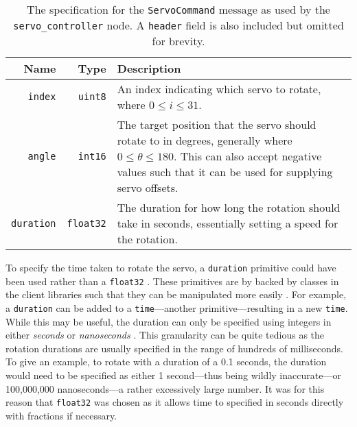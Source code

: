 \begin{table}[!h]
	\centering
	\begin{tabular}{ r r p{10cm} }
		\toprule
		\textbf{Name} & 
		\textbf{Type} & 
		\textbf{Description} \\
		\midrule

		\texttt{index} & 
		\texttt{uint8} &
		An index indicating which servo to rotate, where $0 \leq i \leq 31$. \\
		
		\hline

		\texttt{angle} & 
		\texttt{int16} & 
		The target position that the servo should rotate to in degrees, generally where $0 \leq \theta \leq 180$. This can also accept negative values such that it can be used for supplying servo offsets. \\
		
		\hline

		\texttt{duration} &
		\texttt{float32} &
		The duration for how long the rotation should take in seconds, essentially setting a speed for the rotation. \\
		\bottomrule
	\end{tabular}
	\caption{The specification for the \texttt{ServoCommand} message as used by the \texttt{servo\_controller} node. A \texttt{header} field is also included but omitted for brevity.}
	\label{tab:servocommand_msg}
\end{table}

To specify the time taken to rotate the servo, a \texttt{duration} primitive could have been used rather than a \texttt{float32} \cite{ros_wiki_msg}. These primitives are by backed by classes in the client libraries such that they can be manipulated more easily \cite{ros_api_duration_msg}. For example, a \texttt{duration} can be added to a \texttt{time}---another primitive---resulting in a new \texttt{time}. While this may be useful, the duration can only be specified using integers in either \emph{seconds} or \emph{nanoseconds} \cite{ros_api_duration_msg}. This granularity can be quite tedious as the rotation durations are usually specified in the range of hundreds of milliseconds. To give an example, to rotate with a duration of a 0.1 seconds, the duration would need to be specified as either 1 second---thus being wildly inaccurate---or 100,000,000 nanoseconds---a rather excessively large number. It was for this reason that \texttt{float32} was chosen as it allows time to specified in seconds directly with fractions if necessary.

